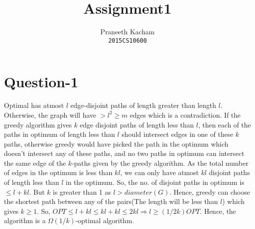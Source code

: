 \documentclass{article}
\title{Assignment1}
\author{Praneeth Kacham \\ \texttt{2015CS10600}}
\date{}
\begin{document}
\maketitle
\section{Question-1}
Optimal has atmost $l$ edge-disjoint paths of length greater than length $l$. Otherwise, the graph will have $> l^2 \geq m$ edges which is a contradiction. If the greedy algorithm gives $k$ edge disjoint paths of length less than $l$, then each of the paths in optimum of length less than $l$ should intersect edges in one of these $k$ paths, otherwise greedy would have picked the path in the optimum which doesn't intersect any of these paths, and no two paths in optimum can intersect the same edge of the $k$-paths given by the greedy algorithm. As the total number of edges in the optimum is less than $kl$, we can only have atmost $kl$ disjoint paths of length less than $l$ in the optimum. So, the no. of disjoint paths in optimum is $\leq l + kl$. But $k$ is greater than 1 as $l > diameter(G)$. Hence, greedy can choose the shortest path between any of the pairs(The length will be less than $l$) which gives $k \geq 1$. So, $OPT \leq l + kl \leq kl + kl \leq 2kl \Rightarrow l \geq (1/2k)OPT$. Hence, the algorithm is a $\Omega(1/k)$-optimal algorithm.
\end{document}
